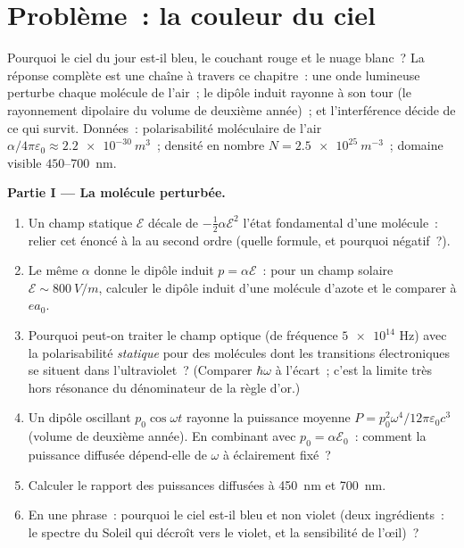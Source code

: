 \section{Problème~: la couleur du ciel}

\begin{problem}\label{pb:b3:perturbation-theory:1}
Pourquoi le ciel du jour est-il bleu, le couchant rouge et le nuage
blanc~? La réponse complète est une chaîne à travers ce chapitre~: une
onde lumineuse perturbe chaque molécule de l'air~; le dipôle induit
rayonne à son tour (le rayonnement dipolaire du volume de deuxième
année)~; et l'interférence décide de ce qui survit. Données~:
polarisabilité moléculaire de l'air
$\alpha/4\pi\varepsilon_0 \approx \qty{2.2e-30}{m^3}$~; densité en
nombre $N = \qty{2.5e25}{m^{-3}}$~; domaine visible
$450$--\qty{700}{nm}.

\medskip\noindent\textbf{Partie I --- La molécule perturbée.}
\begin{enumerate}
  \item Un champ statique $\mathcal E$ décale de
        $-\tfrac12\alpha\mathcal E^2$ l'état fondamental d'une
        molécule~: relier cet énoncé à la  au
        second ordre (quelle formule, et pourquoi négatif~?).
  \item Le même $\alpha$ donne le dipôle induit $p =
        \alpha\mathcal E$~: pour un champ solaire $\mathcal E \sim
        \qty{800}{V/m}$, calculer le dipôle induit d'une molécule
        d'azote et le comparer à $ea_0$.
  \item Pourquoi peut-on traiter le champ optique (de fréquence
        $\num{5e14}$ Hz) avec la polarisabilité \emph{statique} pour
        des molécules dont les transitions électroniques se situent
        dans l'ultraviolet~? (Comparer $\hbar\omega$ à l'écart~; c'est
        la limite très hors résonance du dénominateur de la règle
        d'or.)
  \item Un dipôle oscillant $p_0\cos\omega t$ rayonne la puissance
        moyenne $P = p_0^2\omega^4/12\pi\varepsilon_0c^3$ (volume de
        deuxième année). En combinant avec $p_0 = \alpha\mathcal
        E_0$~: comment la puissance diffusée dépend-elle de $\omega$
        à éclairement fixé~?
  \item Calculer le rapport des puissances diffusées à \qty{450}{nm}
        et \qty{700}{nm}.
  \item En une phrase~: pourquoi le ciel est-il bleu et non violet
        (deux ingrédients~: le spectre du Soleil qui décroît vers le
        violet, et la sensibilité de l'œil)~?
\end{enumerate}


\end{problem}
